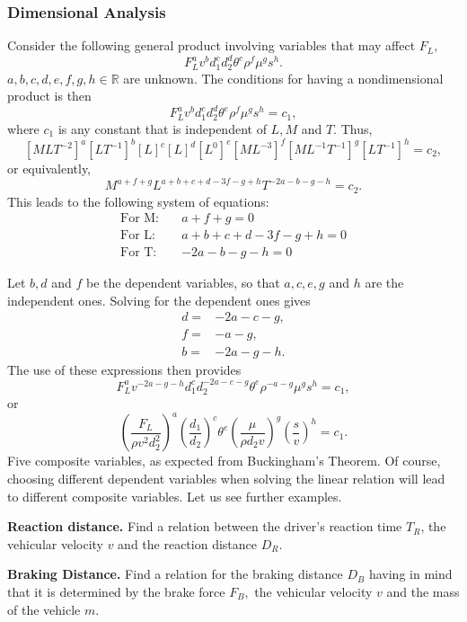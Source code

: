 \documentclass[xcolor=svgnames, t]{beamer}
\theoremstyle{definition}
\theoremstyle{plain}
\theoremstyle{remark}
\begin{document}
\begin{frame}[allowframebreaks]
	\frametitle{Dimensional Analysis}
	Consider the following general product involving variables that may affect $ F_L, $ 
	$$ F_L^av^bd_1^cd_2^d\theta^e\rho^f\mu^gs^h. $$ 
	$ a,b,c,d,e,f,g,h\in \mathbb{R} $ are unknown. The conditions for having a nondimensional product is then
	$$ F_L^av^bd_1^cd_2^d\theta^e\rho^f\mu^gs^h=c_1, $$ 
	where $ c_1 $ is any constant that is independent of $ L, M $ and $ T. $  Thus,
	$$ [MLT^{-2}]^a [LT^{-1}]^b [L]^c [L]^d [L^0]^e [ML^{-3}]^f [ML^{-1}T^{-1}]^g [LT^{-1}]^h = c_2, $$ 
	or equivalently,
	$$ M^{a+f+g} L^{a+b+c+d-3f-g+h} T^{-2a-b-g-h} = c_2.$$ 
	This leads to the following system of equations:
	\begin{align*}
    \text{For M:} \quad & a + f + g = 0 \\
    \text{For L:} \quad & a + b + c + d - 3f - g + h = 0 \\
    \text{For T:} \quad & -2a - b - g - h = 0
\end{align*}

Let $ b,d $ and $f$ be the dependent variables, so that $ a,c,e,g $ and $ h $ are the independent ones. Solving for the dependent ones gives
\begin{align*}
	d=&-2a-c-g,\\
	f=&-a-g,\\
	b=&-2a-g-h.
\end{align*}
The use of these expressions then provides
$$ F_L^a v^{-2a-g-h}d_1^cd_2^{-2a-c-g}\theta^e\rho^{-a-g}\mu^g s^h =c_1, $$ 
or 
$$ \left( \frac{F_L}{\rho v^2 d_2^2} \right)^a \left( \frac{d_1}{d_2} \right)^c \theta^e \left( \frac{\mu}{\rho d_2 v} \right)^g \left( \frac{s}{v} \right)^h = c_1. $$ 
Five composite variables, as expected from Buckingham's Theorem. Of course, choosing different dependent variables when solving the linear relation will lead to different composite variables.
Let us see further examples.

\textbf{Reaction distance.} Find a relation between the driver's reaction time $ T_R $, the vehicular velocity $ v $ and the reaction distance $ D_R. $   

\textbf{Braking Distance.} Find a relation for the braking distance $ D_B $ having in mind that it is determined by the brake force $ F_B ,$ the vehicular velocity $ v $ and the mass of the vehicle $ m $.
\end{frame}
\end{document}
